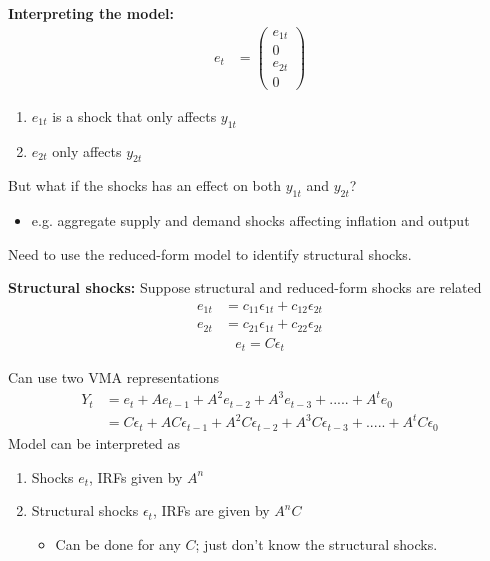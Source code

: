 \documentclass{beamer}
\begin{document}
\begin{frame}
  \textbf{Interpreting the model:} 
  \begin{align}
    e_t &= \begin{pmatrix}
        e_{1t} \\ 0 \\ e_{2t} \\ 0 
      \end{pmatrix}
  \end{align}
  \begin{enumerate}
    \item $e_{1t}$ is a shock that only affects $y_{1t}$
    \item $e_{2t}$ only affects $y_{2t}$
  \end{enumerate}
  But what if the shocks has an effect on both $y_{1t}$ and $y_{2t}$? 
  \begin{itemize}    
    \item e.g. aggregate supply and demand shocks affecting inflation and output
  \end{itemize}
  \medskip
  Need to use the reduced-form model to identify structural shocks.
\end{frame}

\begin{frame}
  \textbf{Structural shocks:} Suppose structural and reduced-form shocks are related
  \begin{align}
      e_{1t}&= c_{11}\epsilon_{1t} + c_{12}\epsilon_{2t}\\ \nonumber
      e_{2t}&= c_{21}\epsilon_{1t} + c_{22}\epsilon_{2t}  
  \end{align}
  \begin{align}  
      e_t= C\epsilon_t 
  \end{align}
\end{frame}

\begin{frame}
  Can use two VMA representations
\begin{align}
  Y_t &= e_t + Ae_{t-1} + A^2e_{t-2} + A^3e_{t-3} + ..... + A^te_0\\
      &= C\epsilon_t +  AC\epsilon_{t-1} + A^2C\epsilon_{t-2} + A^3C\epsilon_{t-3} + ..... + A^tC\epsilon_0
\end{align}
\medskip
Model can be interpreted as
\begin{enumerate}
  \item Shocks $e_t$, IRFs given by $A^n$
  \item Structural shocks $\epsilon_t$, IRFs are given by $A^nC$
  \begin{itemize}
     \item Can be done for any $C$; just don't know the structural shocks.
   \end{itemize} 
\end{enumerate}
\end{frame}
\end{document}
